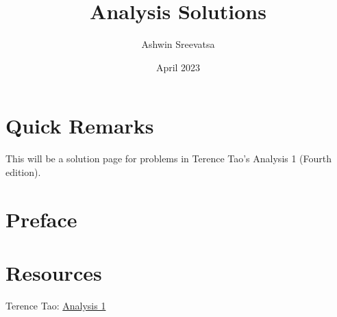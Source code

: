 \documentclass[answers,12pt]{exam}
\title{Analysis Solutions}
\author{Ashwin Sreevatsa}
\date{April 2023}
\begin{document}
\maketitle
\setcounter{section}{-1}

\section*{Quick Remarks}
This will be a solution page for problems in Terence Tao's Analysis 1 (Fourth edition).

\section{Preface}



\section{Resources}
Terence Tao: \href{https://terrytao.wordpress.com/books/analysis-i/}{Analysis 1}
\end{document}
